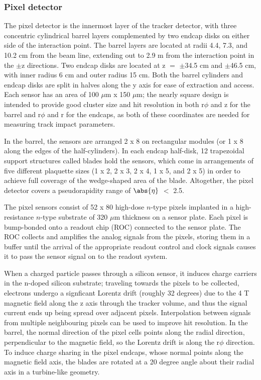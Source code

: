 \subsubsection{Pixel detector\label{sec:cms-pixel}}

The pixel detector is the innermost layer of the tracker detector, with three concentric cylindrical barrel layers complemented by two endcap disks on either side of the interaction point. The barrel layers are located at radii 4.4, 7.3, and 10.2 cm from the beam line, extending out to 2.9 m from the interaction point in the $\pm$z directions. Two endcap disks are located at z $=$ $\pm$34.5 cm and $\pm$46.5 cm, with inner radius 6 cm and outer radius 15 cm. Both the barrel cylinders and endcap disks are split in halves along the y axis for ease of extraction and access. Each sensor has an area of 100 $\mu$m x 150 $\mu$m; the nearly square design is intended to provide good cluster size and hit resolution in both r$\phi$ and z for the barrel and r$\phi$ and r for the endcaps, as both of these coordinates are needed for measuring track impact parameters.

In the barrel, the sensors are arranged 2 x 8 on rectangular modules (or 1 x 8 along the edges of the half-cylinders). In each endcap half-disk, 12 trapezoidal support structures called blades hold the sensors, which come in arrangements of five different plaquette sizes (1 x 2, 2 x 3, 2 x 4, 1 x 5, and 2 x 5) in order to achieve full coverage of the wedge-shaped area of the blade. Altogether, the pixel detector covers a pseudorapidity range of $\abs{\eta}$ $<$ 2.5.

The pixel sensors consist of 52 x 80 high-dose $n$-type pixels implanted in a high-resistance $n$-type substrate of 320 $\mu$m thickness on a sensor plate. Each pixel is bump-bonded onto a readout chip (ROC) connected to the sensor plate. The ROC collects and amplifies the analog signals from the pixels, storing them in a buffer until the arrival of the appropriate readout control and clock signals causes it to pass the sensor signal on to the readout system.
 
When a charged particle passes through a silicon sensor, it induces charge carriers in the n-doped silicon substrate; traveling towards the pixels to be collected, electrons undergo a signficant Lorentz drift (roughly 32 degrees) due to the 4 T magnetic field along the z axis through the tracker volume, and thus the signal current ends up being spread over adjacent pixels. Interpolation between signals from multiple neighbouring pixels can be used to improve hit resolution. In the barrel, the normal direction of the pixel cells points along the radial direction, perpendicular to the magnetic field, so the Lorentz drift is along the r$\phi$ direction. To induce charge sharing in the pixel endcaps, whose normal points along the magnetic field axis, the blades are rotated at a 20 degree angle about their radial axis in a turbine-like geometry.

